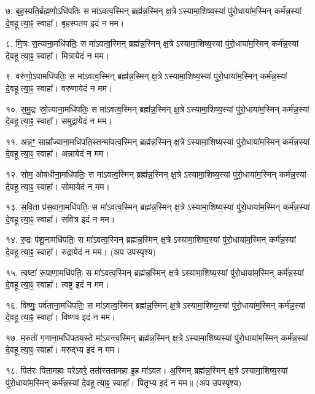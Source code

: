 ७. बृह॒स्पति॒र्ब्रह्म॒णोऽधि॑पतिः स मा॑ऽवत्व॒स्मिन् ब्रह्म॑न्न॒स्मिन् क्ष॒त्रेऽस्यामा॒शिष्य॒स्यां पु॑रो॒धाया॑म॒स्मिन् कर्म॑न्न॒स्यां दे॒वहूत्या॒ꣴ॒ स्वाहा᳚। बृहस्पतय इदं न मम।

८. मि॒त्रः स॒त्याना॒मधि॑पतिः॒ स मा॑ऽवत्व॒स्मिन् ब्रह्म॑न्न॒स्मिन् क्ष॒त्रेऽस्यामा॒शिष्य॒स्यां पु॑रो॒धाया॑म॒स्मिन् कर्म॑न्न॒स्यां दे॒वहूत्या॒ꣴ॒ स्वाहा᳚। मित्रायेदं न मम।

९. वरु॑णो॒ऽपामधि॑पतिः॒ स मा॑ऽवत्व॒स्मिन् ब्रह्म॑न्न॒स्मिन् क्ष॒त्रेऽस्यामा॒शिष्य॒स्यां पु॑रो॒धाया॑म॒स्मिन् कर्म॑न्न॒स्यां दे॒वहूत्या॒ꣴ॒ स्वाहा᳚। वरुणायेदं न मम।

१०. स॒मु॒द्रः स्रो॒त्याना॒मधि॑पतिः॒ स मा॑ऽवत्व॒स्मिन् ब्रह्म॑न्न॒स्मिन् क्ष॒त्रेऽस्यामा॒शिष्य॒स्यां पु॑रो॒धाया॑म॒स्मिन् कर्म॑न्न॒स्यां दे॒वहूत्या॒ꣴ॒ स्वाहा᳚। समुद्रायेदं न मम।

११. अन्न॒ꣳ॒ साम्रा᳚ज्याना॒मधि॑पति॒स्तन्मा॑वत्व॒स्मिन् ब्रह्म॑न्न॒स्मिन् क्ष॒त्रेऽस्यामा॒शिष्य॒स्यां पु॑रो॒धाया॑म॒स्मिन् कर्म॑न्न॒स्यां दे॒वहूत्या॒ꣴ॒ स्वाहा᳚। अन्नायेदं न मम।

१२. सोम॒ ओष॑धीना॒मधि॑पतिः॒ स मा॑ऽवत्व॒स्मिन् ब्रह्म॑न्न॒स्मिन् क्ष॒त्रेऽस्यामा॒शिष्य॒स्यां पु॑रो॒धाया॑म॒स्मिन् कर्म॑न्न॒स्यां दे॒वहूत्या॒ꣴ॒ स्वाहा᳚। सोमायेदं न मम।

१३. स॒वि॒ता प्र॑स॒वाना॒मधि॑पतिः॒ स मा॑ऽवत्व॒स्मिन् ब्रह्म॑न्न॒स्मिन् क्ष॒त्रेऽस्यामा॒शिष्य॒स्यां पु॑रो॒धाया॑म॒स्मिन् कर्म॑न्न॒स्यां दे॒वहूत्या॒ꣴ॒ स्वाहा᳚। सवित्र इदं न मम।

१४. रु॒द्रः प॑शू॒नामधि॑पतिः॒ स मा॑ऽवत्व॒स्मिन् ब्रह्म॑न्न॒स्मिन् क्ष॒त्रेऽस्यामा॒शिष्य॒स्यां पु॑रो॒धाया॑म॒स्मिन् कर्म॑न्न॒स्यां दे॒वहूत्या॒ꣴ॒ स्वाहा᳚। रुद्रायेदं न मम। (अप उपस्पृश्य)

१५. त्वष्टा॑ रू॒पाणा॒मधि॑पतिः॒ स मा॑ऽवत्व॒स्मिन् ब्रह्म॑न्न॒स्मिन् क्ष॒त्रेऽस्यामा॒शिष्य॒स्यां पु॑रो॒धाया॑म॒स्मिन् कर्म॑न्न॒स्यां दे॒वहूत्या॒ꣴ॒ स्वाहा᳚। त्वष्ट्र इदं न मम।

१६. विष्णुः॒ पर्व॑ताना॒मधि॑पतिः॒ स मा॑ऽवत्व॒स्मिन् ब्रह्म॑न्न॒स्मिन् क्ष॒त्रेऽस्यामा॒शिष्य॒स्यां पु॑रो॒धाया॑म॒स्मिन् कर्म॑न्न॒स्यां दे॒वहूत्या॒ꣴ॒ स्वाहा᳚। विष्णव इदं न मम।

१७. म॒रुतो॑ ग॒णाना॒मधि॑पतय॒स्ते मा॑ऽवन्त्व॒स्मिन् ब्रह्म॑न्न॒स्मिन् क्ष॒त्रेऽस्यामा॒शिष्य॒स्यां पु॑रो॒धाया॑म॒स्मिन् कर्म॑न्न॒स्यां दे॒वहूत्या॒ꣴ॒ स्वाहा᳚। मरुद्भ्य इदं न मम।

१८. पित॑रः पितामहाः परेऽवरे॒ तता॑॑स्ततामहा इ॒ह मा॑ऽवत। अ॒स्मिन् ब्रह्म॑न्न॒स्मिन् क्ष॒त्रेऽस्यामा॒शिष्य॒स्यां पु॑रो॒धाया॑म॒स्मिन् कर्म॑न्न॒स्यां दे॒वहूत्या॒ꣴ॒ स्वाहा᳚। पितृभ्य इदं न मम॥ (अप उपस्पृश्य)


